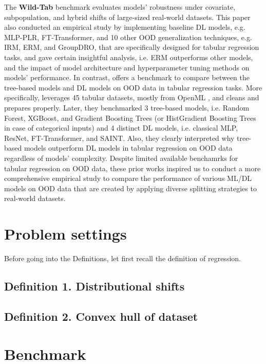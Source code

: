 \documentclass[12pt,a4paper]{article}
\theoremstyle{definition}
\theoremstyle{remark}
\begin{document}
\noindent
The \textbf{Wild-Tab} benchmark \cite{kolesnikov2023wildtabbenchmarkoutofdistributiongeneralization}
evaluates models' robustness under covariate, subpopulation, and hybrid shifts of large-sized real-world datasets.
This paper also conducted an empirical study by implementing baseline DL models, e.g. MLP-PLR, FT-Transformer, and 10 other OOD generalization techniques, e.g. IRM, ERM, and GroupDRO, that are specifically designed for tabular regression tasks, and gave certain insightful analysis,
i.e. ERM outperforms other models, and the impact of model architecture and hyperparameter tuning methods on models' performance.
In contrast, \cite{grinsztajn2022treebasedmodelsoutperformdeep} offers a benchmark to compare between the tree-based models and DL models on OOD data in tabular regression tasks.
More specifically, \cite{grinsztajn2022treebasedmodelsoutperformdeep} leverages 45 tabular datasets, mostly from OpenML \cite{Vanschoren_2014}, and cleans and prepares properly.
Later, they benchmarked 3 tree-based models, i.e. Random Forest, XGBoost, and Gradient Boosting Trees (or HistGradient Boosting Trees in case of categorical inputs) and 4 distinct DL models, i.e. classical MLP, ResNet, FT-Transformer, and SAINT.
Also, they clearly interpreted why tree-based models outperform DL models in tabular regression on OOD data regardless of models' complexity.
Despite limited available benchamrks for tabular regression on OOD data, these prior works inspired us to conduct a more comprehensive empirical study to compare the performance of various ML/DL models on OOD data that are created by applying diverse splitting strategies to real-world datasets.

\section{Problem settings}

Before going into the Definitions, let first recall the definition of regression.

\subsection{Definition 1. Distributional shifts}

\subsection{Definition 2. Convex hull of dataset}

\section{Benchmark}
\end{document}

